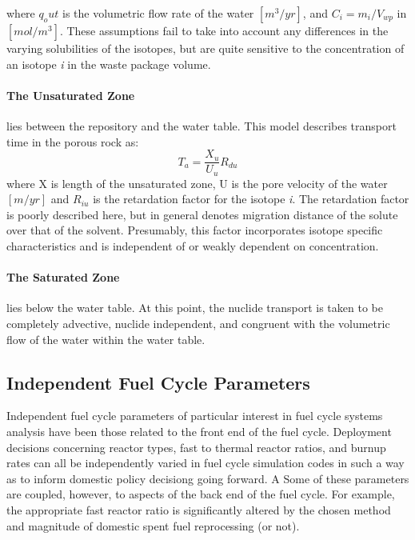where $q_out$ is the volumetric flow rate of the water $[m^3/yr]$, and 
$C_i = m_i/V_{wp}$ in $[mol/m^3]$. These assumptions fail to take into 
account any differences in the varying solubilities of the isotopes, 
but are quite sensitive to the concentration of an isotope \emph{i} in 
the waste package volume.  

\paragraph{The Unsaturated Zone} lies between the repository and the 
water table. This model describes transport time in the porous rock 
as:
\begin{equation}
T_a= \frac{X_u}{U_u}R_{du}
\end{equation}
where X is length of the unsaturated zone, U is the pore velocity of 
the water $[m/yr]$ and $R_{iu}$ is the retardation factor for the 
isotope \emph{i}. The retardation factor is poorly described here, but 
in general denotes migration distance of the solute over that of the 
solvent. Presumably, this factor incorporates isotope specific 
characteristics and is independent of or weakly dependent on 
concentration.  

\paragraph{The Saturated Zone} lies below the water table. At this 
point, the nuclide transport is taken to be completely advective, 
nuclide independent, and congruent with the volumetric flow of the 
water within the water table. 



\subsection{Independent Fuel Cycle Parameters}
Independent fuel cycle parameters of particular interest in fuel cycle 
systems analysis have been those related to the front end of the fuel 
cycle. Deployment decisions concerning reactor types, fast to thermal 
reactor ratios, and burnup rates can all be independently varied in 
fuel cycle simulation codes in such a way as to inform domestic policy 
decisiong going forward. A Some of these parameters are coupled, 
however, to aspects of the back end of the fuel cycle. For example, 
the appropriate fast reactor ratio is significantly altered by the 
chosen method and magnitude of domestic spent fuel reprocessing (or 
not).

